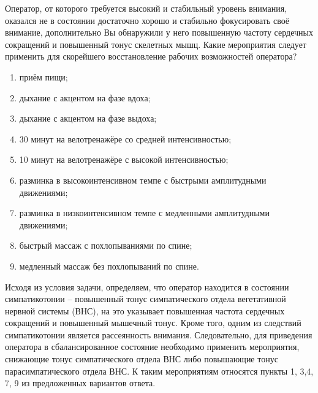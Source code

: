 
Оператор, от которого требуется высокий и стабильный уровень внимания, оказался не в состоянии достаточно хорошо и стабильно фокусировать своё внимание, дополнительно Вы обнаружили у него повышенную частоту сердечных сокращений и повышенный тонус скелетных мышц. Какие мероприятия следует применить для скорейшего восстановление рабочих возможностей оператора?

\begin{enumerate}
    \item приём пищи;
    \item дыхание с акцентом на фазе вдоха;
    \item дыхание с акцентом на фазе выдоха;
    \item 30 минут на велотренажёре со средней интенсивностью;
    \item 10 минут на велотренажёре с высокой интенсивностью;
    \item разминка в высокоинтенсивном темпе с быстрыми амплитудными движениями;
    \item разминка в низкоинтенсивном темпе с медленными амплитудными движениями;
    \item быстрый массаж с похлопываниями по спине;
    \item медленный массаж без похлопываний по спине.
\end{enumerate}

\explanationSection

Исходя из условия задачи, определяем, что оператор находится в состоянии симпатикотонии  – повышенный тонус симпатического отдела вегетативной нервной системы (ВНС), на это указывает повышенная частота сердечных сокращений и повышенный мышечный тонус. Кроме того, одним из следствий симпатикотонии является рассеянность внимания. Следовательно, для приведения оператора в сбалансированное состояние необходимо применить мероприятия, снижающие тонус симпатического отдела ВНС либо повышающие тонус парасимпатического отдела ВНС. К таким мероприятиям относятся пункты 1, 3,4, 7, 9 из предложенных вариантов ответа.


